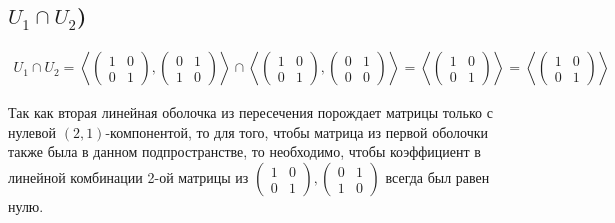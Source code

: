 \subsection{$U_1 \cap U_2$)}
\begin{gather}
    U_1 \cap U_2 = 
    \left<
        \begin{pmatrix}
            1 & 0 \\
            0 & 1
        \end{pmatrix},
        \begin{pmatrix}
            0 & 1 \\
            1 & 0
        \end{pmatrix}
    \right>\cap
    \left<
        \begin{pmatrix}
            1 & 0 \\
            0 & 1
        \end{pmatrix},
        \begin{pmatrix}
            0 & 1 \\
            0 & 0
        \end{pmatrix}
    \right> = 
    \left<
        \begin{pmatrix}
            1 & 0 \\
            0 & 1
        \end{pmatrix}
    \right> = 
    \left<
        \begin{pmatrix}
            1 & 0 \\
            0 & 1
        \end{pmatrix}
    \right>
\end{gather}
\begin{remark}
    Так как вторая линейная оболочка из пересечения порождает матрицы только с нулевой $(2,1)$-компонентой, то для того, чтобы матрица из первой оболочки также была в данном подпространстве, то необходимо, чтобы коэффициент в линейной комбинации 2-ой матрицы из 
    $ \begin{pmatrix}
            1 & 0 \\
            0 & 1
        \end{pmatrix},
        \begin{pmatrix}
            0 & 1 \\
            1 & 0
        \end{pmatrix}$ всегда был равен нулю.
\end{remark}

